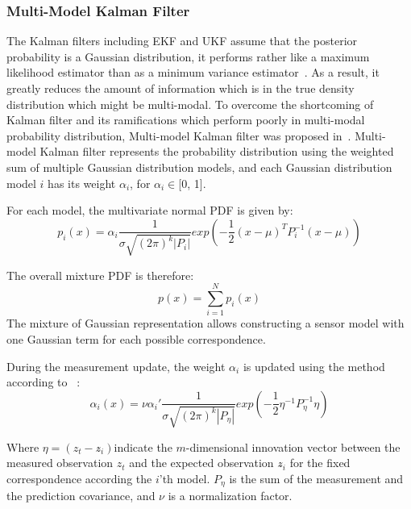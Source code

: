 \subsubsection{Multi-Model Kalman Filter}\label{sub:mmkalman}
The Kalman filters including \gls{EKF} and \gls{UKF} assume that the posterior probability is a Gaussian distribution, it performs rather like a maximum likelihood estimator than as a minimum variance estimator~\cite{alspach1972nonlinear}. As a result, it greatly reduces the amount of information which is in the true density distribution which might be multi-modal. To overcome the shortcoming of Kalman filter and its ramifications which perform poorly in multi-modal probability distribution, Multi-model Kalman filter was proposed in~\cite{alspach1972nonlinear}. Multi-model Kalman filter represents the probability distribution using the weighted sum of multiple Gaussian distribution models, and each Gaussian distribution model $i$ has its weight $\alpha_i$, for $\alpha_i \in $[0, 1].

For each model, the multivariate normal \gls{PDF} is given by:
\begin{equation}
\label{eq:mmkalman}
p_{i}(x) = \alpha_i\frac{1}{\sigma \sqrt {(2\pi)^k|P_i|}}exp(-\frac{1}{2}(x-\mu)^TP_i^{-1}(x-\mu))
\end{equation}

The overall mixture \gls{PDF} is therefore:
\begin{equation}
\label{eq:mmkalmansum}
p(x) = \sum_{i=1}^{N}p_i(x)
\end{equation}
The mixture of Gaussian representation allows constructing a sensor model with one Gaussian term for each possible correspondence.

During the measurement update, the weight $\alpha_i$ is updated using the method according to ~\cite{alspach1972nonlinear}:
\begin{equation}
\label{eq:weightupdate}
\alpha_{i}(x) = \nu\alpha_i'\frac{1}{\sigma \sqrt {(2\pi)^k|P_\eta|}}exp(-\frac{1}{2}\eta^{-1}P_\eta^{-1}\eta)
\end{equation}

Where $\eta = (z_t - z\widehat{}_i)$indicate the $m$-dimensional innovation vector between the measured observation $z_t$ and the expected observation $z\widehat{}_i$ for the fixed correspondence according the $i$'th model. $P_\eta$ is the sum of the measurement and the prediction covariance, and $\nu$ is a normalization factor.

